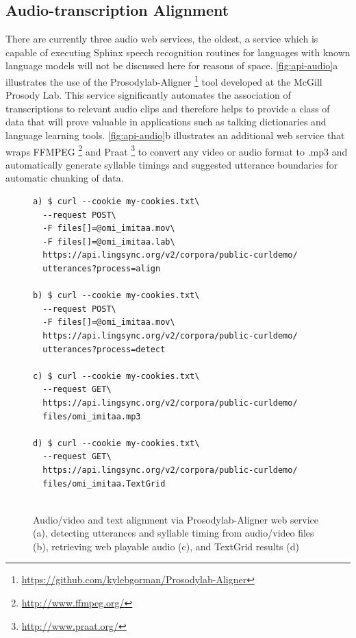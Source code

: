 \documentclass[11pt]{article}
\begin{document}
\subsection{Audio-transcription Alignment}
\label{sec:aligner}

There are currently three audio web services, the oldest, a service which is
capable of executing Sphinx speech recognition routines for languages with
known language models  will not be discussed here for reasons of space. 
\autoref{fig:api-audio}a illustrates the use of the Prosodylab-Aligner%
\footnote{\url{https://github.com/kylebgorman/Prosodylab-Aligner}} %
tool developed at the McGill Prosody Lab. This service significantly automates
the association of transcriptions to relevant audio clips and therefore helps
to provide a class of data that will prove valuable in applications such as
talking dictionaries and language learning tools. \autoref{fig:api-audio}b
illustrates an additional web service that wraps FFMPEG%
\footnote{\url{http://www.ffmpeg.org/}} %
and Praat%
\footnote{\url{http://www.praat.org/}} %
to convert any video or audio format to .mp3 and automatically generate
syllable timings and suggested utterance boundaries \cite{DeJong:2009} for
automatic chunking of data.


\begin{figure}[h]
\scriptsize
\begin{verbatim}
a) $ curl --cookie my-cookies.txt\
  --request POST\
  -F files[]=@omi_imitaa.mov\
  -F files[]=@omi_imitaa.lab\
  https://api.lingsync.org/v2/corpora/public-curldemo/
  utterances?process=align

b) $ curl --cookie my-cookies.txt\
  --request POST\
  -F files[]=@omi_imitaa.mov\
  https://api.lingsync.org/v2/corpora/public-curldemo/
  utterances?process=detect
  
c) $ curl --cookie my-cookies.txt\
  --request GET\
  https://api.lingsync.org/v2/corpora/public-curldemo/
  files/omi_imitaa.mp3
 
d) $ curl --cookie my-cookies.txt\
  --request GET\
  https://api.lingsync.org/v2/corpora/public-curldemo/
  files/omi_imitaa.TextGrid
   
\end{verbatim}
\caption{Audio/video and text alignment via Prosodylab-Aligner web service (a),
detecting utterances and syllable timing from audio/video files (b), retrieving
web playable audio (c), and TextGrid results (d)}
\normalsize
\label{fig:api-audio}
\end{figure}
\end{document}
